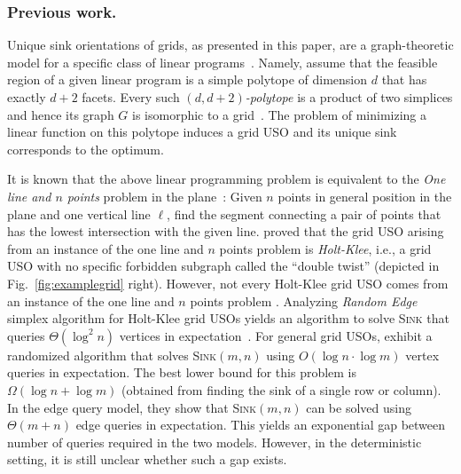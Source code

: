\documentclass[runningheads,a4paper]{llncs}
\newcommand{\RR}{\ensuremath{\mathbb{R}}}
\newcommand{\sink}{\textsc{Sink}\xspace}
\newcommand{\sinkmn}{\textsc{Sink}$(m,n)$\xspace}
\begin{document}
\subsubsection{Previous work.}

Unique sink orientations of grids, as presented in this paper,
are a graph-theoretic model for a specific class of linear programs~\cite{grid05}.
Namely, assume that the feasible region of a given linear program is a
simple polytope of dimension $d$ that has exactly $d+2$ facets.
Every such \emph{$(d, d+2)$-polytope} is a product of two simplices and hence its graph $G$ is isomorphic to a grid~\cite{grid05}. 
The problem of minimizing a linear function on this polytope induces a grid USO and its unique sink corresponds to the optimum. 


It is known that the above linear programming problem is equivalent to the \emph{One line and $n$ points} problem in the plane~\cite{linepoint,welzl2001entering}:
Given $n$ points in general position in the plane and one vertical line $\ell$, find the segment connecting a pair of points that has the lowest intersection with the given line. 
\citet{linepoint} proved that the grid USO arising from an instance of the one line and $n$ points problem is \emph{Holt-Klee}, i.e., a grid USO with no specific forbidden subgraph called the ``double twist'' (depicted in Fig.~\ref{fig:examplegrid} right).
However, not every Holt-Klee grid USO comes from an instance of the one line and $n$ points problem \cite{grid05}.
Analyzing \emph{Random Edge} simplex algorithm for Holt-Klee grid USOs yields an algorithm to solve \sink that queries $\Theta(\log^2 n)$ vertices in expectation~\cite{linepoint,grid05,falkthesis}.
For general grid USOs, \citet{grid08} exhibit a randomized algorithm that solves \sinkmn using $O(\log n\cdot  \log m)$ vertex queries in expectation.
The best lower bound for this problem is $\Omega(\log n + \log m)$ (obtained from finding the sink of a single row or column).
In the edge query model, they show that \sinkmn can be solved using $\Theta(m+n)$ edge queries in expectation. 
This yields an exponential gap between number of queries required in the two models. 
However, in the deterministic setting, it is still unclear whether such a gap exists.
\end{document}
